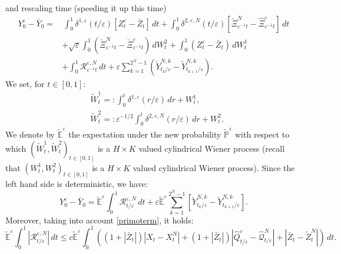 \documentclass[reqno,a4paper,11 pt]{article}
\def \E {\mathbb{E}}
\def \e {\varepsilon}
\numberwithin{equation}{section}
\begin{document}
and rescaling time (speeding it up this time)
\begin{align*}
Y^\e _0 -\bar Y_0 = & \, \int_0^{1} \delta^{1,\e}( t/\e) [Z^\e_{ t} -\bar{Z}_{ t}] \, dt + \int_0^{1}\delta^{2,\e,N}(t/\e)[\check{\Xi}^{N}_{\e^{-1}t} -\hat{\Xi}^\e_{\e^{-1}t}]\, dt 
\\ &
 +  \sqrt{\e} \int_0^{1}(\check{\Xi}^{N}_{\e^{-1}t} -\check{\Xi}^\e_{\e^{-1}t})  \, d{{W}}^2_t  +\int_0^{1} (Z^\e_{ t}-\bar{Z}_{ t})\,d W^1_t
\\ & 
 + \int_0^{1} {\mathcal{R}}^{\e,N}_{\e^{-1}t} \, dt +\e  \sum_{k=1}^{2^N-1} (\check{Y}^{N,k}_{t_{k}/\e}-\check{Y}^{N,k}_{t_{k+1}/\e }) .
\end{align*}
We set, for $ t\in [0,1]$:
\begin{align}
&\widetilde{W}^{1}_t =:  \int_0^{t} \delta^{1,\e}(r/\e)\,dr +  W^1_t, \\
&\widetilde{W}^2_{t}=:  \e^{-1/2}\int_0^{t}\delta^{2,\e,N}(r/\e)\,dr +  W^2_{t}.
\end{align}
We denote by $\widetilde{\E}^\e$ the expectation under the new probability $\tilde{\mathbb{P}}^\e$  with respect to which $(\widetilde{W}^{1}_t, \widetilde{W}^2_{t})_{t\in [0,1]}$ is a $H\times K$ valued cylindrical Wiener process (recall that $({W}^{1}_t, {W}^2_{t})_{t\in [0,1]}$ is a $H\times K$ valued cylindrical Wiener process). 
Since the left hand side is deterministic, we have:
\begin{equation}\label{diffGirs}
Y^\e _0 -\bar Y_0 = \widetilde{\E}^\e \int_0^{1} {\mathcal{R}}^{\e,N}_{t/\e} \, dt+ \e\widetilde{\E}^\e  \sum_{k=1}^{2^N-1} [\check{Y}^{N,k}_{t_{k}/\e}-\check{Y}^{N,k}_{t_{k+1}/\e }].\end{equation}
Moreover, taking into account \eqref{primoterm}, it holds: $$ \widetilde{\E}^\e \int_0^{1} |{\mathcal{R}}^{\e,N}_{t/\e}| \, dt \leq c \widetilde{\E}^\e \int_0^{1}  \left((1+|\bar{Z}_t|)|{X}_{ t}-{X}^N_t| + 
(1+|\bar{Z}_t|)|\hat{Q}^\e_{ t/\e}-\hat{\mathcal{Q}}^N_{t /\e}|+ |\bar{Z}_{t}-\widetilde{Z}^N_t|\right)\, dt.$$
\end{document}
